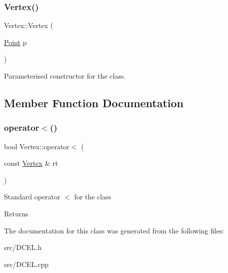 \subsubsection{\texorpdfstring{Vertex()}{Vertex()}}
{\footnotesize\ttfamily Vertex\+::\+Vertex (\begin{DoxyParamCaption}\item[{\hyperlink{classPoint}{Point}}]{p }\end{DoxyParamCaption})}

Parameterised constructor for the class. 

\subsection{Member Function Documentation}
\mbox{\label{classVertex_a625610fd16b3db424ab78069a4994f48}} 
\subsubsection{\texorpdfstring{operator$<$()}{operator<()}}
{\footnotesize\ttfamily bool Vertex\+::operator$<$ (\begin{DoxyParamCaption}\item[{const \hyperlink{classVertex}{Vertex} \&}]{rt }\end{DoxyParamCaption})}

Standard operator $<$ for the class \begin{DoxyReturn}{Returns}

\end{DoxyReturn}


The documentation for this class was generated from the following files\+:\begin{DoxyCompactItemize}
\item 
src/D\+C\+E\+L.\+h\item 
src/D\+C\+E\+L.\+cpp\end{DoxyCompactItemize}
